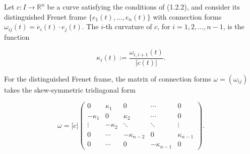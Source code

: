 Let $c: I \to \mathbb{R}^n$ be a curve satisfying the conditions of (1.2.2), and consider its distinguished Frenet frame $\{e_1(t), \ldots, e_n(t)\}$ with connection forms $\omega_{ij}(t) = \dot{e}_i(t) \cdot e_j(t)$. The $i$-th curvature of $c$, for $i = 1, 2, \ldots, n - 1$, is the function

$$\kappa_i(t) := \frac{\omega_{i,i+1}(t)}{|\dot{c}(t)|}.$$

For the distinguished Frenet frame, the matrix of connection forms $\omega = (\omega_{ij})$ takes the skew-symmetric tridiagonal form

$$\omega = |\dot{c}| \begin{pmatrix}
0 & \kappa_1 & 0 & \cdots & 0 \\
-\kappa_1 & 0 & \kappa_2 & \cdots & 0 \\
\vdots & -\kappa_2 & \ddots & \ddots & \vdots \\
0 & \cdots & -\kappa_{n-2} & 0 & \kappa_{n-1} \\
0 & \cdots & 0 & -\kappa_{n-1} & 0
\end{pmatrix}.$$
